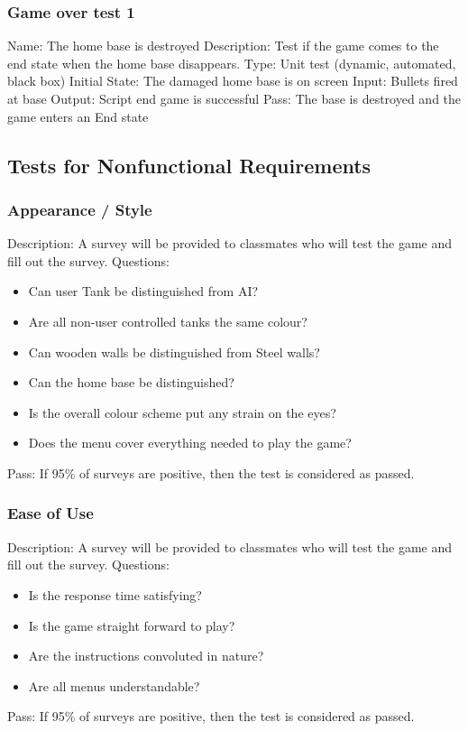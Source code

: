 \documentclass{article}
\begin{document}
\subsubsection{Game over test 1}
Name:  The home base is destroyed\newline
Description: Test if the game comes to the end state when the home base 
disappears. \newline
Type: Unit test (dynamic, automated, black box) \newline
Initial State:  The damaged home base is on screen \newline
Input: Bullets fired at base\newline
Output: Script end game is successful\newline
Pass:  The base is destroyed and the game enters an End state \newline





\subsection{Tests for Nonfunctional Requirements}

\subsubsection{Appearance / Style}
Description: A survey will be provided to classmates who will test the game 
and fill out the survey.  \newline
Questions: 
\begin{itemize}
\item Can user Tank be distinguished from AI?
\item Are all non-user controlled tanks the same colour?
\item Can wooden walls be distinguished from Steel walls?
\item Can the home base be distinguished?
\item Is the overall colour scheme put any strain on the eyes?
\item Does the menu cover everything needed to play the game?
\end{itemize}
Pass: If 95\% of surveys are positive, then the test is considered as passed.


\subsubsection{Ease of Use}
Description: A survey will be provided to classmates who will test the game 
and fill out the survey.  \newline
Questions: 
\begin{itemize}
\item Is the response time satisfying?
\item Is the game straight forward to play?
\item Are the instructions convoluted in nature?
\item Are all menus understandable?
\end{itemize}
Pass: If 95\% of surveys are positive, then the test is considered as passed.
\end{document}
